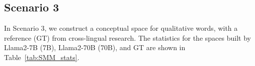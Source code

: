 




\subsection{Scenario 3}
In Scenario 3, we construct a conceptual space for qualitative words, with a reference (GT) from cross-lingual research. The statistics for the spaces built by Llama2-7B (7B), Llama2-70B (70B), and GT are shown in Table~\ref{tab:SMM_stats}.


